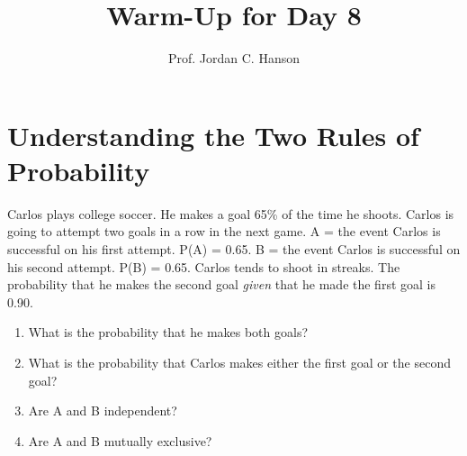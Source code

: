 \documentclass{article}
\begin{document}
\title{Warm-Up for Day 8}
\author{Prof. Jordan C. Hanson}

\maketitle

\section{Understanding the Two Rules of Probability}

Carlos plays college soccer. He makes a goal 65\% of the time he shoots. Carlos is going to attempt two goals in a row in the next game. A = the event Carlos is successful on his first attempt. P(A) = 0.65. B = the event Carlos is successful on his second attempt. P(B) = 0.65. Carlos tends to shoot in streaks. The probability that he makes the second goal \textit{given} that he made the first goal is 0.90.

\begin{enumerate}
\item What is the probability that he makes both goals?
\item What is the probability that Carlos makes either the first goal or the second goal?
\item Are A and B independent?
\item Are A and B mutually exclusive?
\end{enumerate}
\end{document}
